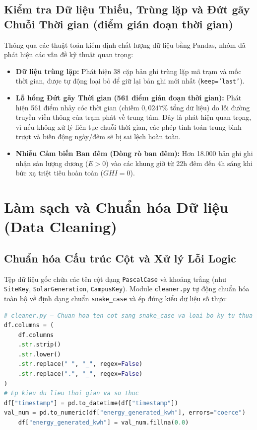 \subsection{Kiểm tra Dữ liệu Thiếu, Trùng lặp và Đứt gãy Chuỗi Thời gian (điểm gián đoạn thời gian)}
Thông qua các thuật toán kiểm định chất lượng dữ liệu bằng Pandas, nhóm đã phát hiện các vấn đề kỹ thuật quan trọng:
\begin{itemize}[noitemsep]
    \item \textbf{Dữ liệu trùng lặp:} Phát hiện 38 cặp bản ghi trùng lặp mã trạm và mốc thời gian, được tự động loại bỏ để giữ lại bản ghi mới nhất (\texttt{keep='last'}).
    \item \textbf{Lỗ hổng Đứt gãy Thời gian (561 điểm gián đoạn thời gian):} Phát hiện 561 điểm nhảy cóc thời gian (chiếm $0{,}0247\%$ tổng dữ liệu) do lỗi đường truyền viễn thông của trạm phát về trung tâm. Đây là phát hiện quan trọng, vì nếu không xử lý liên tục chuỗi thời gian, các phép tính toán trung bình trượt và biến động ngày/đêm sẽ bị sai lệch hoàn toàn.
    \item \textbf{Nhiễu Cảm biến Ban đêm (Dòng rò ban đêm):} Hơn 18.000 bản ghi ghi nhận sản lượng dương ($E > 0$) vào các khung giờ từ 22h đêm đến 4h sáng khi bức xạ triệt tiêu hoàn toàn ($GHI = 0$).
\end{itemize}

\section{Làm sạch và Chuẩn hóa Dữ liệu (Data Cleaning)}
\label{sec:data_cleaning}

\subsection{Chuẩn hóa Cấu trúc Cột và Xử lý Lỗi Logic}
Tệp dữ liệu gốc chứa các tên cột dạng \texttt{PascalCase} và khoảng trắng (như \texttt{SiteKey}, \texttt{SolarGeneration}, \texttt{CampusKey}). Module \texttt{cleaner.py} tự động chuẩn hóa toàn bộ về định dạng chuẩn \texttt{snake\_case} và ép đúng kiểu dữ liệu số thực:

\begin{lstlisting}[language=Python, caption={Đoạn mã Python chuẩn hóa cấu trúc cột sang snake\_case}, label={lst:clean_columns}]
# cleaner.py — Chuan hoa ten cot sang snake_case va loai bo ky tu thua
df.columns = (
    df.columns
    .str.strip()
    .str.lower()
    .str.replace(" ", "_", regex=False)
    .str.replace(".", "_", regex=False)
)
# Ep kieu du lieu thoi gian va so thuc
df["timestamp"] = pd.to_datetime(df["timestamp"])
val_num = pd.to_numeric(df["energy_generated_kwh"], errors="coerce")
    df["energy_generated_kwh"] = val_num.fillna(0.0)
\end{lstlisting}

